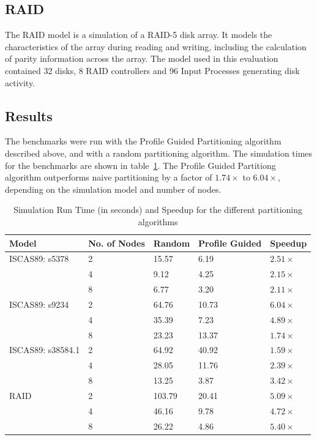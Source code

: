 \documentclass{wscpaperproc}
\begin{document}
\subsection{RAID}
The RAID model is a simulation of a RAID-5 disk array. It models the characteristics of the array during reading and writing, including the calculation of parity information across the array. The model used in this evaluation contained 32 disks, 8 RAID controllers and 96 Input Processes generating disk activity.

\subsection{Results}

The benchmarks were run with the Profile Guided Partitioning algorithm described above, and with a random partitioning algorithm. The simulation times for the benchmarks are shown in table~\ref{table:benchmarks}. The Profile Guided Partitiong algorithm outperforms naive partitioning by a factor of \(1.74\times\) to \(6.04\times\), depending on the simulation model and number of nodes.

\begin{table}[h]
\centering
\begin{tabular}{@{}lllll@{}}
\toprule
Model             & No. of Nodes & Random & Profile Guided & Speedup           \\ \midrule
ISCAS89: s5378    & 2            & 15.57  & 6.19           & \(2.51\times\)    \\
                  & 4            & 9.12   & 4.25           & \(2.15\times\)    \\
                  & 8            & 6.77   & 3.20           & \(2.11\times\)    \\ \midrule
ISCAS89: s9234    & 2            & 64.76  & 10.73          & \(6.04\times\)    \\
                  & 4            & 35.39  & 7.23           & \(4.89\times\)    \\
                  & 8            & 23.23  & 13.37          & \(1.74\times\)    \\ \midrule
ISCAS89: s38584.1 & 2            & 64.92  & 40.92          & \(1.59\times\)    \\
                  & 4            & 28.05  & 11.76          & \(2.39\times\)    \\
                  & 8            & 13.25  & 3.87           & \(3.42\times\)    \\ \midrule
RAID              & 2            & 103.79 & 20.41          & \(5.09\times\)    \\
                  & 4            & 46.16  & 9.78           & \(4.72\times\)    \\
                  & 8            & 26.22  & 4.86           & \(5.40\times\)    \\ \bottomrule
\end{tabular}
\caption{Simulation Run Time (in seconds) and Speedup for the different partitioning algorithms}
\label{table:benchmarks}
\end{table}
\end{document}

